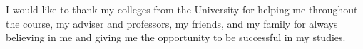 
%

\begin{ntacknowledgements}

I would like to thank my colleges from the University for helping me throughout the course,
my adviser and professors, my friends, and my family for always believing in me and giving me
the opportunity to be successful in my studies.

\end{ntacknowledgements}